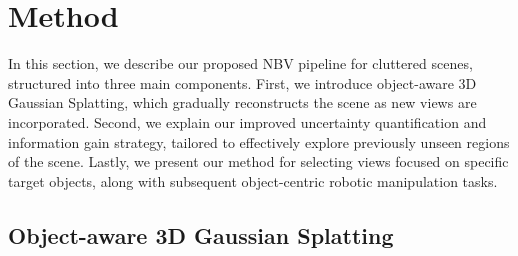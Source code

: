\section{Method}


In this section, we describe our proposed \ac{NBV} pipeline for cluttered scenes, structured into three main components. First, we introduce object-aware 3D Gaussian Splatting, which gradually reconstructs the scene as new views are incorporated. Second, we explain our improved uncertainty quantification and information gain strategy, tailored to effectively explore previously unseen regions of the scene. Lastly, we present our method for selecting views focused on specific target objects, along with subsequent object-centric robotic manipulation tasks.



\subsection{Object-aware 3D Gaussian Splatting}

